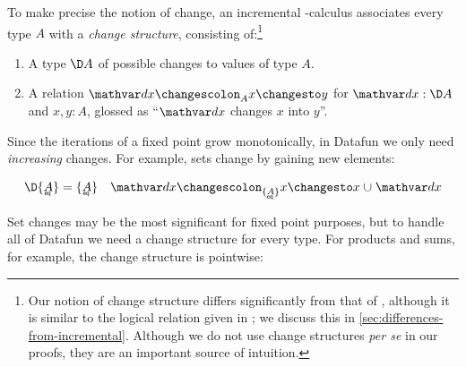 To make precise the notion of change, an incremental \fn-calculus associates
every type $A$ with a \emph{change structure}, consisting of:\footnote{Our
  notion of change structure differs significantly from that of
  \citet{incremental}, although it is similar to the logical relation given in
  \citet{DBLP:conf/esop/GiarrussoRS19}; we discuss this in
  \cref{sec:differences-from-incremental}. Although we do not use change
  structures \emph{per se} in our proofs, they are an important source of
  intuition.}

\begin{enumerate}
\item A type $\D A$ of possible changes to values of type $A$.
\item A relation $\changesat{A}{\dx}{x}{y}$ for $\dx : \D A$ and $x,y : A$,
  glossed as ``$\dx$ changes $x$ into $y$''.
\end{enumerate}

\noindent
Since the iterations of a fixed point grow monotonically, in Datafun we only
need \emph{increasing} changes.
%
For example, sets change by gaining new elements:

\begin{align*}
  \D\tseteq{A} &= \tseteq{A}
  &
  \changesat{\tseteq{A}}{\dx}{x}{x \cup \dx}
\end{align*}

Set changes may be the most significant for fixed point purposes, but to handle
all of Datafun we need a change structure for every type. For products and sums,
for example, the change structure is pointwise:



